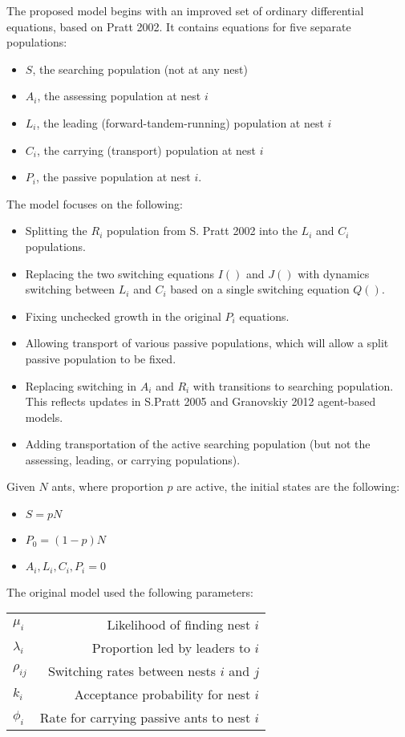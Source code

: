 \documentclass{article}
\begin{document}
  The proposed model begins with an improved set of ordinary differential equations, based on Pratt 2002.
  It contains equations for five separate populations: 
  \begin{itemize}
      \item $S$, the searching population (not at any nest)
      \item $A_i$, the assessing population at nest $i$
      \item $L_i$, the leading (forward-tandem-running) population at nest $i$
      \item $C_i$, the carrying (transport) population at nest $i$
      \item $P_i$, the passive population at nest $i$. 
  \end{itemize}
  The model focuses on the following:
  \begin{itemize}
      \item Splitting the $R_i$ population from S. Pratt 2002 into the $L_i$ and $C_i$ populations.
      \item Replacing the two switching equations $I()$ and $J()$ with dynamics switching between $L_i$ and $C_i$ based on a single switching equation $Q()$.
      \item Fixing unchecked growth in the original $P_i$ equations.
      \item Allowing transport of various passive populations, which will allow a split passive population to be fixed.
      \item Replacing switching in $A_i$ and $R_i$ with transitions to searching population. This reflects updates in S.Pratt 2005 and Granovskiy 2012 agent-based models.
      \item Adding transportation of the active searching population (but not the assessing, leading, or carrying populations).
  \end{itemize}

  Given $N$ ants, where proportion $p$ are active, the initial states are the following:
  \begin{itemize}
      \item $S = pN$
      \item $P_0 = (1-p)N$ 
      \item $A_i, L_i, C_i, P_i = 0$ 
  \end{itemize}

  The original model used the following parameters:\\

\begin{tabular}{ l | r }
    \hline
  $\mu_i$     & Likelihood of finding nest $i$\\
  $\lambda_i$ & Proportion led by leaders to $i$\\
  $\rho_{ij}$ & Switching rates between nests $i$ and $j$\\
  $k_i$       & Acceptance probability for nest $i$\\
  $\phi_i$    & Rate for carrying passive ants to nest $i$\\
    \hline
\end{tabular} \\
\end{document}
